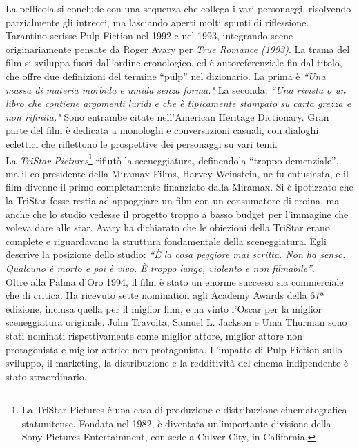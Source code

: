 \documentclass[12pt]{article} %
\begin{document}
\begin{flushleft}
    La pellicola si conclude con una sequenza che collega i vari personaggi, risolvendo parzialmente gli intrecci, ma lasciando aperti molti spunti di riflessione.
    \\\vspace{1cm}
    Tarantino scrisse Pulp Fiction nel 1992 e nel 1993, integrando scene originariamente pensate da Roger Avary per \textit{True Romance (1993)}. La trama del film si sviluppa fuori dall'ordine cronologico, ed è autoreferenziale fin dal titolo, che offre due definizioni del termine “pulp” nel dizionario. 
    La prima è \textit{``Una massa di materia morbida e umida senza forma."} La seconda: \textit{``Una rivista o un libro che contiene argomenti luridi e che è tipicamente stampato su carta grezza e non rifinita."} Sono entrambe citate nell'American Heritage Dictionary.
    Gran parte del film è dedicata a monologhi e conversazioni casuali, con dialoghi eclettici che riflettono le prospettive dei personaggi su vari temi. \\\vspace{1cm} La \textit{TriStar Pictures}\footnote{La TriStar Pictures è una casa di produzione e distribuzione cinematografica statunitense. Fondata nel 1982, è diventata un'importante divisione della Sony Pictures Entertainment, con sede a Culver City, in California.} rifiutò la sceneggiatura, definendola “troppo demenziale”, ma il co-presidente della Miramax Films, Harvey Weinstein, ne fu entusiasta, e il film divenne il primo completamente finanziato dalla Miramax.
    Si è ipotizzato che la TriStar fosse restia ad appoggiare un film con un consumatore di eroina, ma anche che lo studio vedesse il progetto troppo a basso budget per l'immagine che voleva dare alle star. Avary ha dichiarato che le obiezioni della TriStar erano complete e riguardavano la struttura fondamentale della sceneggiatura. Egli descrive la posizione dello studio: \textit{“È la cosa peggiore mai scritta. Non ha senso. Qualcuno è morto e poi è vivo. È troppo lungo, violento e non filmabile”}.
    \\\vspace{1cm}
    Oltre alla Palma d'Oro 1994, il film è stato un enorme successo sia commerciale che di critica. Ha ricevuto sette nomination agli Academy Awards della 67ª edizione, inclusa quella per il miglior film, e ha vinto l'Oscar per la miglior sceneggiatura originale. John Travolta, Samuel L. Jackson e Uma Thurman sono stati nominati rispettivamente come miglior attore, miglior attore non protagonista e miglior attrice non protagonista. 
    L'impatto di Pulp Fiction sullo sviluppo, il marketing, la distribuzione e la redditività del cinema indipendente è stato straordinario. 

\end{flushleft}
\end{document}
